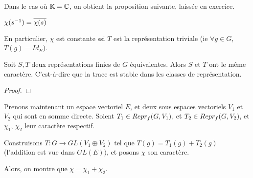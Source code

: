 Dans le cas où $\mathbb{K} = \mathbb{C}$, on obtient la proposition suivante, laissée en exercice.

\begin{proposition}
	$\chi(s^{-1}) = \overline{\chi(s)}$
\end{proposition}

En particulier, $\chi$ est constante ssi $T$ est la représentation triviale (ie $\forall g \in G$, $T(g) =
Id_{E}$).

\begin{proposition}
	Soit $S, T$ deux représentations finies de $G$ équivalentes. Alors $S$ et
	$T$ ont le même caractère. C'est-à-dire que la trace est stable dans les
	classes de représentation.
\end{proposition}

\ifdefined\outputproof
\begin{proof}

\end{proof}
\fi

Prenons maintenant un espace vectoriel $E$, et deux sous espaces vectoriels
$V_{1}$ et $V_{2}$ qui sont en somme directe.
Soient $T_{1} \in Repr_{f}(G, V_{1})$, et $T_{2} \in Repr_{f}(G, V_{2})$, et
$\chi_{1}$, $\chi_{2}$ leur caractère respectif.

Construisons $T : G \rightarrow GL(V_{1} \oplus V_{2})$ tel que $T(g) = T_{1}(g)
+ T_{2}(g)$ (l'addition est vue dans $GL(E))$, et posons $\chi$ son caractère.

Alors, on montre que $\chi = \chi_{1} + \chi_{2}$.
